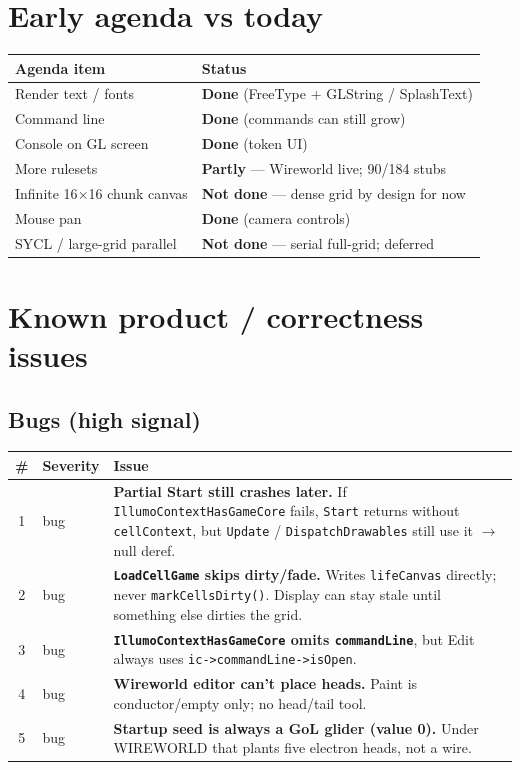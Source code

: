 \documentclass[10pt,a4paper]{article}
\begin{document}
\section{Early agenda vs today}
\begin{table}[h!]
\centering
\small
\begin{tabularx}{\textwidth}{l X}
\toprule
\textbf{Agenda item} & \textbf{Status} \\
\midrule
Render text / fonts & \textbf{Done} (FreeType + GLString / SplashText) \\
Command line & \textbf{Done} (commands can still grow) \\
Console on GL screen & \textbf{Done} (token UI) \\
More rulesets & \textbf{Partly} --- Wireworld live; 90/184 stubs \\
Infinite 16$\times$16 chunk canvas & \textbf{Not done} --- dense grid by design for now \\
Mouse pan & \textbf{Done} (camera controls) \\
SYCL / large-grid parallel & \textbf{Not done} --- serial full-grid; deferred \\
\bottomrule
\end{tabularx}
\end{table}

\section{Known product / correctness issues}

\subsection{Bugs (high signal)}
\begin{table}[h!]
\centering
\small
\begin{tabularx}{\textwidth}{c l X}
\toprule
\textbf{\#} & \textbf{Severity} & \textbf{Issue} \\
\midrule
1 & bug & \textbf{Partial Start still crashes later.} If \texttt{IllumoContextHasGameCore} fails, \texttt{Start} returns without \texttt{cellContext}, but \texttt{Update} / \texttt{DispatchDrawables} still use it $\rightarrow$ null deref. \\
2 & bug & \textbf{\texttt{LoadCellGame} skips dirty/fade.} Writes \texttt{lifeCanvas} directly; never \texttt{markCellsDirty()}. Display can stay stale until something else dirties the grid. \\
3 & bug & \textbf{\texttt{IllumoContextHasGameCore} omits \texttt{commandLine}}, but Edit always uses \texttt{ic->commandLine->isOpen}. \\
4 & bug & \textbf{Wireworld editor can't place heads.} Paint is conductor/empty only; no head/tail tool. \\
5 & bug & \textbf{Startup seed is always a GoL glider (value 0).} Under WIREWORLD that plants five electron heads, not a wire. \\
\bottomrule
\end{tabularx}
\end{table}
\end{document}
